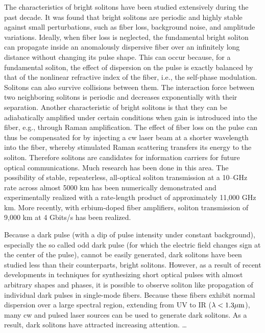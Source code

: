 The characteristics of bright solitons have been studied extensively during
the past decade.\cite{AA,MB} It was found\cite{SA} that bright solitons are
periodic and highly stable against small perturbations, such as fiber loss,
background noise, and amplitude variations.\cite{HA,HB} Ideally, when fiber
loss is neglected, the fundamental bright soliton can propagate inside an
anomalously dispersive fiber over an infinitely long distance without
changing its pulse shape.  This can occur because, for a fundamental
soliton, the effect of dispersion on the pulse is exactly balanced by that
of the nonlinear refractive index of the fiber, i.e., the self-phase
modulation.  Solitons can also survive collisions between them.  The
interaction force between two neighboring solitons is periodic and
decreases exponentially with their separation.\cite{GA} Another
characteristic of bright solitons is that they can be adiabatically
amplified under certain conditions when gain is introduced into the fiber,
e.g., through Raman amplification.\cite{BA} The effect of fiber loss on the
pulse can thus be compensated for by injecting a cw laser beam at a shorter
wavelength into the fiber, whereby stimulated Raman scattering transfers
its energy to the soliton.\cite{HC} Therefore solitons are  candidates for
information carriers for future optical communications.  Much research has
been done in this area.\cite{DA} The possibility of stable, repeaterless,
all-optical soliton transmission at a 10--GHz rate across almost 5000 km
has been numerically demonstrated\cite{HD,MC} and experimentally realized
with a rate-length product of approximately 11,000 GHz km.\cite{MD} More
recently, with erbium-doped fiber amplifiers, soliton transmission of 9,000
km at 4 Gbits/s has been realized.\cite{ME}


Because a dark pulse (with a dip of pulse intensity under constant
background),\cite{EA,KA,WA} especially the so called odd dark pulse (for
which the electric field changes sign at the center of the pulse), cannot
be easily generated, dark solitons have been studied less than their
counterparts, bright solitons.  However, as a result of recent developments
in techniques for synthesizing short optical pulses with almost arbitrary
shapes and phases,\cite{WB} it is possible to observe soliton like
propagation of individual dark pulses in single-mode fibers. Because these
fibers exhibit normal dispersion over a large spectral region, extending
from UV to  IR ($ \lambda < 1.3 \mu\rm m $), many cw and pulsed laser
sources can be used to generate dark solitons.  As a result,  dark solitons
have attracted increasing attention. \ldots


